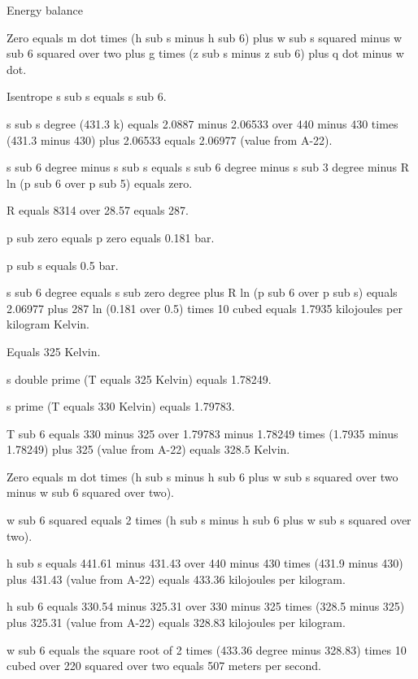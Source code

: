 Energy balance

Zero equals m dot times (h sub s minus h sub 6) plus w sub s squared minus w sub 6 squared over two plus g times (z sub s minus z sub 6) plus q dot minus w dot.

Isentrope s sub s equals s sub 6.

s sub s degree (431.3 k) equals 2.0887 minus 2.06533 over 440 minus 430 times (431.3 minus 430) plus 2.06533 equals 2.06977 (value from A-22).

s sub 6 degree minus s sub s equals s sub 6 degree minus s sub 3 degree minus R ln (p sub 6 over p sub 5) equals zero.

R equals 8314 over 28.57 equals 287.

p sub zero equals p zero equals 0.181 bar.

p sub s equals 0.5 bar.

s sub 6 degree equals s sub zero degree plus R ln (p sub 6 over p sub s) equals 2.06977 plus 287 ln (0.181 over 0.5) times 10 cubed equals 1.7935 kilojoules per kilogram Kelvin.

Equals 325 Kelvin.

s double prime (T equals 325 Kelvin) equals 1.78249.

s prime (T equals 330 Kelvin) equals 1.79783.

T sub 6 equals 330 minus 325 over 1.79783 minus 1.78249 times (1.7935 minus 1.78249) plus 325 (value from A-22) equals 328.5 Kelvin.

Zero equals m dot times (h sub s minus h sub 6 plus w sub s squared over two minus w sub 6 squared over two).

w sub 6 squared equals 2 times (h sub s minus h sub 6 plus w sub s squared over two).

h sub s equals 441.61 minus 431.43 over 440 minus 430 times (431.9 minus 430) plus 431.43 (value from A-22) equals 433.36 kilojoules per kilogram.

h sub 6 equals 330.54 minus 325.31 over 330 minus 325 times (328.5 minus 325) plus 325.31 (value from A-22) equals 328.83 kilojoules per kilogram.

w sub 6 equals the square root of 2 times (433.36 degree minus 328.83) times 10 cubed over 220 squared over two equals 507 meters per second.